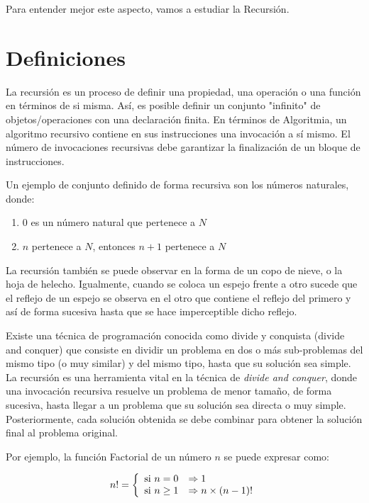 Para entender mejor este aspecto, vamos a estudiar la Recursión.


\section{Definiciones}

La recursión es un proceso de definir una propiedad, una operación o una función en términos de si misma. Así, es posible definir un conjunto "infinito" de objetos/operaciones con una declaración finita. En términos de Algoritmia, un algoritmo recursivo contiene en sus instrucciones una invocación a sí mismo. El número de invocaciones recursivas debe garantizar la finalización de un bloque de instrucciones.

Un ejemplo de conjunto definido de forma recursiva son los números naturales, donde:
\begin{enumerate}
\item $0$ es un número natural que pertenece a $N$
\item $n$ pertenece a $N$, entonces $n+1$ pertenece a $N$
\end{enumerate}

La recursión también se puede observar en la forma de un copo de nieve, o la hoja de helecho. Igualmente, cuando se coloca un espejo frente a otro sucede que el reflejo de un espejo se observa en el otro que contiene el reflejo del primero y así de forma sucesiva hasta que se hace imperceptible dicho reflejo.

Existe una técnica de programación conocida como divide y conquista (divide and conquer) que consiste en dividir un problema en dos o más sub-problemas del mismo tipo (o muy similar) y del mismo tipo, hasta que su solución sea simple. La recursión es una herramienta vital en la técnica de \textit{divide and conquer}, donde una invocación recursiva resuelve un problema de menor tamaño, de forma sucesiva, hasta llegar a un problema que su solución sea directa o muy simple. Posteriormente, cada solución obtenida se debe combinar para obtener la solución final al problema original.

Por ejemplo, la función Factorial de un número $n$ se puede expresar como:

$$
n! = \left\lbrace
\begin{array}{ll}
\textup{si } n=0 & \Rightarrow 1\\
\textup{si } n\geq 1 & \Rightarrow n \times (n-1)!
\end{array}
\right.
$$

